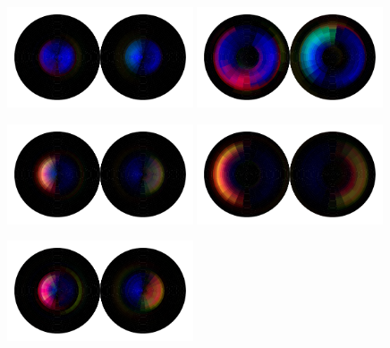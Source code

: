 \begin{figure}[h!]
    \begin{center}
        \includegraphics[width=0.49\textwidth]{figures/appendix_featurevis/TU3_0_1_0.pdf}
        \includegraphics[width=0.49\textwidth]{figures/appendix_featurevis/TU3_0_1_1.pdf}
    \end{center}
    \begin{center}
        \includegraphics[width=0.49\textwidth]{figures/appendix_featurevis/TU3_3_1_0.pdf}
        \includegraphics[width=0.49\textwidth]{figures/appendix_featurevis/TU3_3_1_1.pdf}
    \end{center}
    \begin{center}
        \includegraphics[width=0.49\textwidth]{figures/appendix_featurevis/TU3_4_1_0.pdf}

\end{center}
\end{figure}
